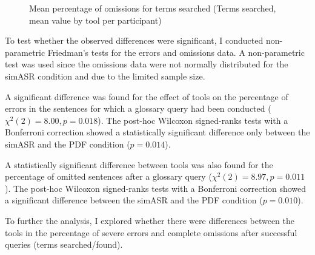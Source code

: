 \begin{figure}
\caption[Mean percentage of omissions (Terms searched, by tool and participant]{Mean percentage of omissions for terms searched (Terms searched, mean value by tool per participant)}
\label{fig:OmSPar}
\end{figure}

To test whether the observed differences were significant, I conducted non-parametric Friedman's tests for the errors and omissions data. A non-parametric test was used since the omissions data were not normally distributed for the simASR condition and due to the limited sample size.

A significant difference was found for the effect of tools on the percentage of errors in the sentences for which a glossary query had been conducted ($\chi^2(2)=8.00, p=0.018$). The post-hoc Wilcoxon signed-ranks tests with a Bonferroni correction showed a statistically significant difference only between the simASR and the PDF condition ($p=0.014$).

A statistically significant difference between tools was also found for the percentage of omitted sentences after a glossary query ($\chi^2(2)=8.97, p=0.011$). The post-hoc Wilcoxon signed-ranks tests with a Bonferroni correction showed a significant difference between the simASR and the PDF condition ($p=0.010$).

 \label{tool_errors_omissions_F}
To further the analysis, I explored whether there were differences between the tools in the percentage of severe errors and complete omissions after successful queries (terms searched/found).

